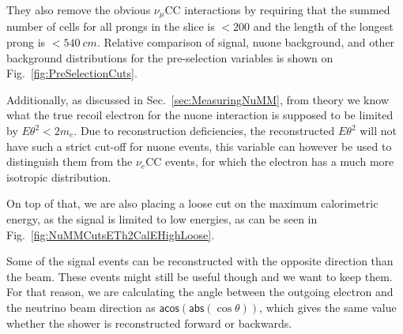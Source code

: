 They also remove the obvious $\nu_\mu$CC interactions by requiring that the summed number of cells for all prongs in the slice is $<200$ and the length of the longest prong is $<540\ \unit{cm}$. Relative comparison of signal, \gls{nuone} background, and other background distributions for the pre-selection variables is shown on Fig.~\ref{fig:PreSelectionCuts}.

Additionally, as discussed in Sec.~\ref{sec:MeasuringNuMM}, from theory we know what the true recoil electron for the \gls{nuone} interaction is supposed to be limited by $E\theta^2<2m_e$. Due to reconstruction deficiencies, the reconstructed $E\theta^2$ will not have such a strict cut-off for \gls{nuone} events, this variable can however be used to distinguish them from the $\nu_e$\gls{CC} events, for which the electron has a much more isotropic distribution.

On top of that, we are also placing a loose cut on the maximum calorimetric energy, as the signal is limited to low energies, as can be seen in Fig.~\ref{fig:NuMMCutsETh2CalEHighLoose}.

Some of the signal events can be reconstructed with the opposite direction than the beam. These events might still be useful though and we want to keep them. For that reason, we are calculating the angle between the outgoing electron and the neutrino beam direction as $\textsf{acos}\left(\textsf{abs}\left(\cos\theta\right)\right)$, which gives the same value whether the shower is reconstructed forward or backwards.

